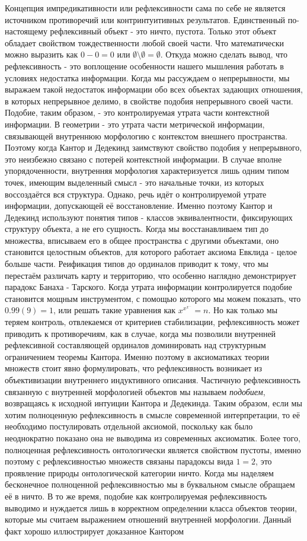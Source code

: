 \documentclass[12pt]{article}
\begin{document}
Концепция импредикативности или рефлексивности сама по себе не является источником противоречий или контринтуитивных результатов. Единственный по-настоящему рефлексивный объект - это ничто, пустота. Только этот объект обладает свойством тождественности любой своей части. Что математически можно выразить как $0 - 0 = 0$ или $\emptyset \setminus \emptyset = \emptyset$. Откуда можно сделать вывод, что рефлексивность - это воплощение особенности нашего мышления работать в условиях недостатка информации. Когда мы рассуждаем о непрерывности, мы выражаем такой недостаток информации обо всех объектах задающих отношения, в которых непрерывное делимо, в свойстве подобия непрерывного своей части. Подобие, таким образом, - это контролируемая утрата части контекстной информации. В геометрии - это утрата части метрической информации, связывающей внутреннюю морфологию с контекстом внешнего пространства. Поэтому когда Кантор и Дедекинд заимствуют свойство подобия у непрерывного, это неизбежно связано с потерей контекстной информации. В случае вполне упорядоченности, внутренняя морфология характеризуется лишь одним типом точек, имеющим выделенный смысл - это начальные точки, из которых воссоздаётся вся структура. Однако, речь идёт о контролируемой утрате информации, допускающей её восстановление. Именно поэтому Кантор и Дедекинд используют понятия типов - классов эквивалентности, фиксирующих структуру объекта, а не его сущность. Когда мы восстанавливаем тип до множества, вписываем его в общее пространства с другими объектами, оно становится целостным объектов, для которого работает аксиома Евклида - целое больше части. Реификация типов до ординалов приводит к тому, что мы перестаём различать карту и территорию, что особенно наглядно демонстрирует парадокс Банаха - Тарского. Когда утрата информации контролируется подобие становится мощным инструментом, с помощью которого мы можем показать, что $0.99(9) = 1$, или решать такие уравнения как $x^{x^{x^{\dots}}} = n$. Но как только мы теряем контроль, отвлекаемся от критериев стабилизации, рефлексивность может приводить к противоречиям, как в случае, когда мы позволили внутренней рефлексивной составляющей ординалов доминировать над структурным ограничением теоремы Кантора. Именно поэтому в аксиоматиках теории множеств стоит явно формулировать, что рефлексивность возникает из объективизации внутреннего индуктивного описания. Частичную рефлексивность связанную с внутренней морфологией объектов мы называем {\it подобием}, возвращаясь к исходной интуиции Кантора и Дедекинда. Таким образом, если мы хотим полноценную рефлексивность в смысле современной интерпретации, то её необходимо постулировать отдельной аксиомой, поскольку как было неоднократно показано она не выводима из современных аксиоматик. Более того, полноценная рефлексивность онтологически является свойством пустоты, именно поэтому с рефлексивностью множеств связаны парадоксы вида $1 = 2$, это проявление природы онтологической категории ничто. Когда мы наделяем бесконечное полноценной рефлексивностью мы в буквальном смысле обращаем её в ничто. В то же время, подобие как контролируемая рефлексивность выводимо и нуждается лишь в корректном определении класса объектов теории, которые мы считаем выражением отношений внутренней морфологии. Данный факт хорошо иллюстрирует доказанное Кантором 
\end{document}
